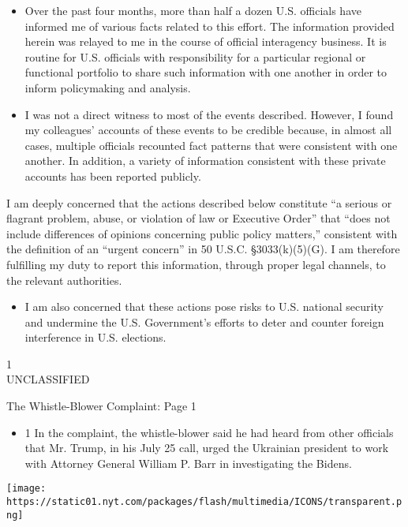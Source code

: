 \begin{itemize}
\tightlist
\item
  Over the past four months, more than half a dozen U.S. officials have
  informed me of various facts related to this effort. The information
  provided herein was relayed to me in the course of official
  interagency business. It is routine for U.S. officials with
  responsibility for a particular regional or functional portfolio to
  share such information with one another in order to inform
  policymaking and analysis.
\item
  I was not a direct witness to most of the events described. However, I
  found my colleagues' accounts of these events to be credible because,
  in almost all cases, multiple officials recounted fact patterns that
  were consistent with one another. In addition, a variety of
  information consistent with these private accounts has been reported
  publicly.
\end{itemize}

I am deeply concerned that the actions described below constitute ``a
serious or flagrant problem, abuse, or violation of law or Executive
Order'' that ``does not include differences of opinions concerning
public policy matters,'' consistent with the definition of an ``urgent
concern'' in 50 U.S.C. §3033(k)(5)(G). I am therefore fulfilling my duty
to report this information, through proper legal channels, to the
relevant authorities.

\begin{itemize}
\tightlist
\item
  I am also concerned that these actions pose risks to U.S. national
  security and undermine the U.S. Government's efforts to deter and
  counter foreign interference in U.S. elections.
\end{itemize}

1\\
UNCLASSIFIED

The Whistle-Blower Complaint: Page 1

\begin{itemize}
\tightlist
\item
  1 In the complaint, the whistle-blower said he had heard from other
  officials that Mr. Trump, in his July 25 call, urged the Ukrainian
  president to work with Attorney General William P. Barr in
  investigating the Bidens.
\end{itemize}

\protect\hyperlink{}{}

\texttt{[image: https://static01.nyt.com/packages/flash/multimedia/ICONS/transparent.png]}

